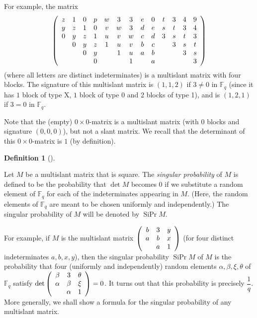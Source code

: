 \documentclass[numbers=enddot,12pt,final,onecolumn,notitlepage]{scrartcl}%
\theoremstyle{definition}
\newtheorem{defi}[theo]{Definition}
\newenvironment{definition}[1][]
{\begin{defi}[#1]\begin{leftbar}}
{\end{leftbar}\end{defi}}
\newcommand{\Fq}{\mathbb{F}_q}
\theoremstyle{plainsl}
\begin{document}
For example, the matrix%
\[
\left(
\begin{array}
[c]{ccccccccccccc}%
z & 1 & 0 & p & w & 3 & 3 & e & 0 & t & 3 & 4 & 9\\
y & z & 1 & 0 & v & w & 3 & d & e & s & t & 3 & 4\\
0 & y & z & 1 & u & v & w & c & d & 3 & s & t & 3\\
& 0 & y & z & 1 & u & v & b & c &  & 3 & s & t\\
&  & 0 & y &  & 1 & u & a & b &  &  & 3 & s\\
&  &  & 0 &  &  & 1 &  & a &  &  &  & 3
\end{array}
\right)
\]
(where all letters are distinct indeterminates) is a multislant matrix with
four blocks. The signature of this multislant matrix is $\left(  1,1,2\right)
$ if $3\neq0$ in $\Fq$ (since it has $1$ block of type X, $1$ block
of type 0 and $2$ blocks of type 1), and is $\left(  1,2,1\right)  $ if $3=0$
in $\Fq$.

Note that the (empty) $0\times0$-matrix is a multislant matrix (with $0$
blocks and signature $\left(  0,0,0\right)  $), but not a slant matrix. We
recall that the determinant of this $0\times0$-matrix is $1$ (by definition).

\begin{definition}
\label{def.SiPr}Let $M$ be a multislant matrix that is square. The
\emph{singular probability} of $M$ is defined to be the probability that $\det
M$ becomes $0$ if we substitute a random element of $\Fq$ for each
of the indeterminates appearing in $M$. (Here, the random elements of
$\Fq$ are meant to be chosen uniformly and independently.) The
singular probability of $M$ will be denoted by $\operatorname*{SiPr}M$.
\end{definition}

For example, if $M$ is the multislant matrix $\left(
\begin{array}
[c]{ccc}%
b & 3 & y\\
a & b & x\\
& a & 1
\end{array}
\right)  $ (for four distinct indeterminates $a,b,x,y$), then the singular
probability $\operatorname*{SiPr}M$ of $M$ is the probability that four
(uniformly and independently) random elements $\alpha,\beta,\xi,\theta$ of
$\Fq$ satisfy $\det\left(
\begin{array}
[c]{ccc}%
\beta & 3 & \theta\\
\alpha & \beta & \xi\\
& \alpha & 1
\end{array}
\right)  =0$. It turns out that this probability is precisely $\dfrac{1}{q}$.
More generally, we shall show a formula for the singular probability of any
multislant matrix.
\end{document}
